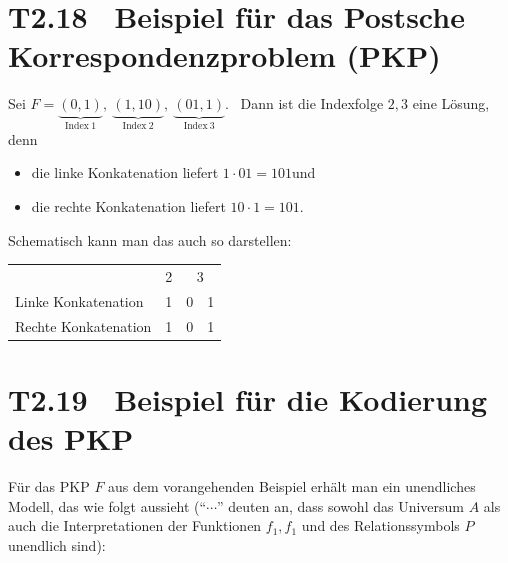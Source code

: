\documentclass[fontsize=11pt, twoside=false, numbers=autoenddot]{scrbook}
\begin{document}
\section*{T2.18~ Beispiel für das Postsche Korrespondenzproblem (PKP)}

Sei $F =
  \underbrace{(0,1)}_{\text{Index}~1},~
  \underbrace{(1,10)}_{\text{Index}~2},~
  \underbrace{(01,1)}_{\text{Index}~3}%
$.~
Dann ist die Indexfolge $2,3$ eine Lösung, denn
%
\par\smallskip
\begin{itemize}
  \item
    die linke Konkatenation liefert $1 \cdot 01 = 101$\quad und
  \item
    die rechte Konkatenation liefert $10 \cdot 1 = 101$.
\end{itemize}
%
Schematisch kann man das auch so darstellen:

\vspace*{-.5\baselineskip}
\begin{center}
  \begin{tabular}{@{}lccc@{}}
                         & {\scriptsize 2} & \multicolumn{2}{c}{{\scriptsize 3}} \\
    Linke Konkatenation  & 1               & \multicolumn{1}{|c}{0} & 1          \\\cline{3-3}
    Rechte Konkatenation & 1               & \multicolumn{1}{c|}{0} & 1
  \end{tabular}
\end{center}

\section*{T2.19~ Beispiel für die Kodierung des PKP}

Für das PKP $F$ aus dem vorangehenden Beispiel erhält man ein unendliches Modell,
das wie folgt aussieht
("`$\cdots$"' deuten an, dass sowohl das Universum $A$
als auch die Interpretationen der Funktionen $f_1,f_1$ und des Relationssymbols $P$ unendlich sind):
\end{document}
